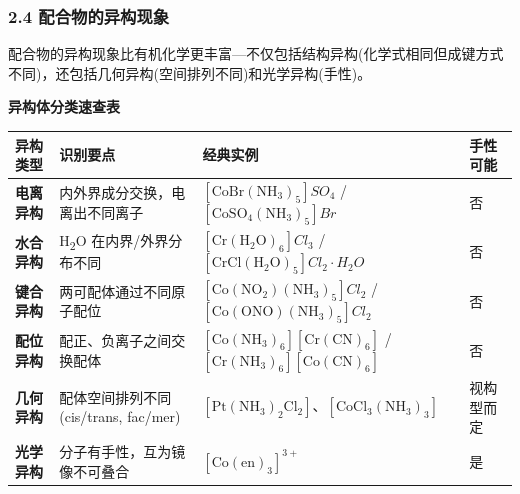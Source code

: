 \subsubsection{2.4 配合物的异构现象}\label{ux914dux5408ux7269ux7684ux5f02ux6784ux73b0ux8c61}

配合物的异构现象比有机化学更丰富---不仅包括结构异构(化学式相同但成键方式不同)，还包括几何异构(空间排列不同)和光学异构(手性)。

\textbf{异构体分类速查表}

{\def\LTcaptype{none} %
\begin{longtable}[]{@{}
  >{\raggedright\arraybackslash}p{}
  >{\raggedright\arraybackslash}p{}
  >{\raggedright\arraybackslash}p{}
  >{\centering\arraybackslash}p{}@{}}
\toprule\noalign{}
\begin{minipage}[b]{\linewidth}\raggedright
异构类型
\end{minipage} & \begin{minipage}[b]{\linewidth}\raggedright
识别要点
\end{minipage} & \begin{minipage}[b]{\linewidth}\raggedright
经典实例
\end{minipage} & \begin{minipage}[b]{\linewidth}\centering
手性可能
\end{minipage} \\
\midrule\noalign{}
\endhead
\bottomrule\noalign{}
\endlastfoot
\textbf{电离异构} & 内外界成分交换，电离出不同离子 & \([\mathrm{CoBr(NH_3)_5}]SO_4\) / \([\mathrm{CoSO_4(NH_3)_5}]Br\) & 否 \\
\textbf{水合异构} & H\textsubscript{2}O 在内界/外界分布不同 & \([\mathrm{Cr(H_2O)_6}]Cl_3\) / \([\mathrm{CrCl(H_2O)_5}]Cl_2\cdot H_2O\) & 否 \\
\textbf{键合异构} & 两可配体通过不同原子配位 & \([\mathrm{Co(NO_2)(NH_3)_5}]Cl_2\) / \([\mathrm{Co(ONO)(NH_3)_5}]Cl_2\) & 否 \\
\textbf{配位异构} & 配正、负离子之间交换配体 & \([\mathrm{Co(NH_3)_6}][\mathrm{Cr(CN)_6}]\) / \([\mathrm{Cr(NH_3)_6}][\mathrm{Co(CN)_6}]\) & 否 \\
\textbf{几何异构} & 配体空间排列不同(cis/trans, fac/mer) & \([\mathrm{Pt(NH_3)_2Cl_2}]\)、\([\mathrm{CoCl_3(NH_3)_3}]\) & 视构型而定 \\
\textbf{光学异构} & 分子有手性，互为镜像不可叠合 & \([\mathrm{Co(en)_3}]^{3+}\) & 是 \\
\end{longtable}
}

